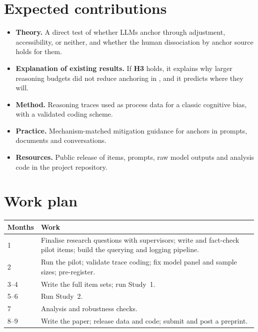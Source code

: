 \documentclass[11pt,a4paper]{article}
\newcommand{\Hyp}[1]{\textbf{H#1}}
\begin{document}
\section{Expected contributions}

\begin{itemize}
  \item \textbf{Theory.} A direct test of whether LLMs anchor through adjustment, accessibility, or neither, and whether the human dissociation by anchor source holds for them.
  \item \textbf{Explanation of existing results.} If \Hyp{3} holds, it explains why larger reasoning budgets did not reduce anchoring in \citet{kraishan2026long}, and it predicts where they will.
  \item \textbf{Method.} Reasoning traces used as process data for a classic cognitive bias, with a validated coding scheme.
  \item \textbf{Practice.} Mechanism-matched mitigation guidance for anchors in prompts, documents and conversations.
  \item \textbf{Resources.} Public release of items, prompts, raw model outputs and analysis code in the project repository.
\end{itemize}

\section{Work plan}

\begin{table}[h]
\centering
\small
\begin{tabularx}{\textwidth}{@{}p{2cm}L@{}}
\toprule
\textbf{Months} & \textbf{Work} \\
   & Finalise research questions with supervisors; write and fact-check pilot items; build the querying and logging pipeline. \\
2   & Run the pilot; validate trace coding; fix model panel and sample sizes; pre-register. \\
3--4 & Write the full item sets; run Study~1. \\
5--6 & Run Study~2. \\
7   & Analysis and robustness checks. \\
8--9 & Write the paper; release data and code; submit and post a preprint. \\
\bottomrule
\end{tabularx}
\end{table}
\end{document}
